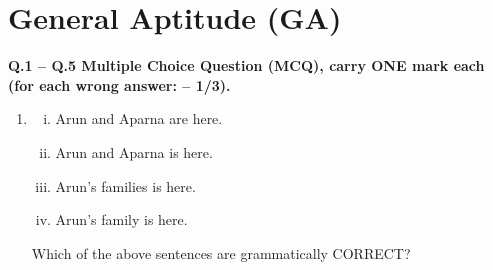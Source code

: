 \documentclass[14pt, a4paper]{extarticle}
\begin{document}
\section*{General Aptitude (GA)}
\textbf{Q.1 – Q.5 Multiple Choice Question (MCQ), carry ONE mark each (for each wrong answer: – 1/3).}

\begin{enumerate}[label=\textbf{Q.\arabic*}]

\item
\begin{enumerate}[(i)]
    \item Arun and Aparna are here.
    \item Arun and Aparna is here.
    \item Arun's families is here.
    \item Arun's family is here.
\end{enumerate}
Which of the above sentences are grammatically CORRECT?
\begin{enumerate}
\end{enumerate}


\end{enumerate}
\end{document}
